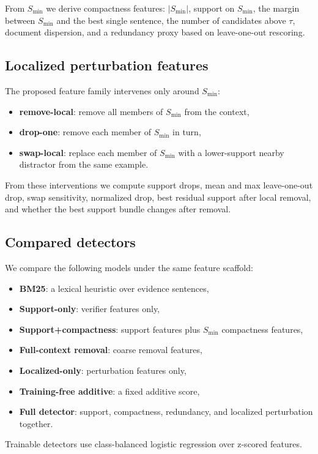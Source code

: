 \documentclass{article}
\newcommand{\smin}{S_{\mathrm{min}}}
\newcommand{\tauv}{\tau}
\begin{document}
From $\smin$ we derive compactness features: $\lvert \smin \rvert$, support on $\smin$, the margin between $\smin$ and the best single sentence, the number of candidates above $\tauv$, document dispersion, and a redundancy proxy based on leave-one-out rescoring.

\subsection{Localized perturbation features}
The proposed feature family intervenes only around $\smin$:
\begin{itemize}[leftmargin=1.2em]
  \item \textbf{remove-local}: remove all members of $\smin$ from the context,
  \item \textbf{drop-one}: remove each member of $\smin$ in turn,
  \item \textbf{swap-local}: replace each member of $\smin$ with a lower-support nearby distractor from the same example.
\end{itemize}
From these interventions we compute support drops, mean and max leave-one-out drop, swap sensitivity, normalized drop, best residual support after local removal, and whether the best support bundle changes after removal.

\subsection{Compared detectors}
We compare the following models under the same feature scaffold:
\begin{itemize}[leftmargin=1.2em]
  \item \textbf{BM25}: a lexical heuristic over evidence sentences,
  \item \textbf{Support-only}: verifier features only,
  \item \textbf{Support+compactness}: support features plus $\smin$ compactness features,
  \item \textbf{Full-context removal}: coarse removal features,
  \item \textbf{Localized-only}: perturbation features only,
  \item \textbf{Training-free additive}: a fixed additive score,
  \item \textbf{Full detector}: support, compactness, redundancy, and localized perturbation together.
\end{itemize}
Trainable detectors use class-balanced logistic regression over z-scored features.
\end{document}
